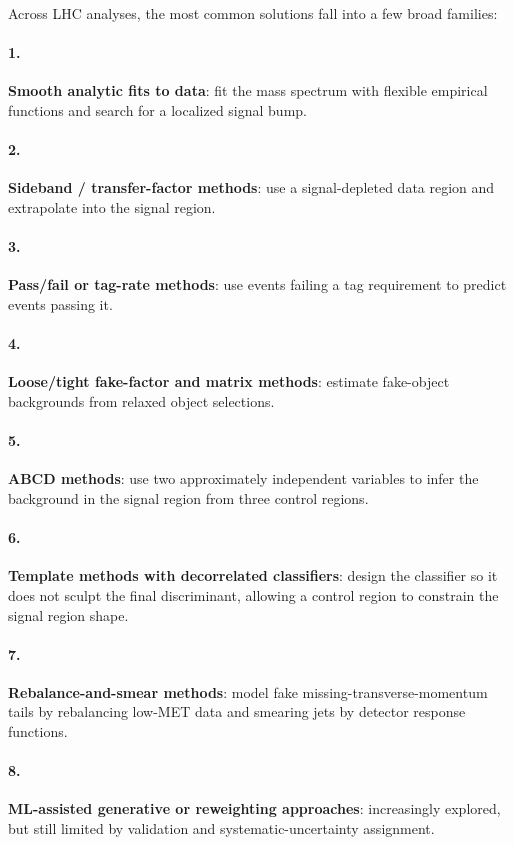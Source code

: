 \documentclass[11pt]{article}
\begin{document}
Across LHC analyses, the most common solutions fall into a few broad families:

\paragraph{1.} \textbf{Smooth analytic fits to data}: fit the mass spectrum with flexible empirical functions and search for a localized signal bump.
\paragraph{2.} \textbf{Sideband / transfer-factor methods}: use a signal-depleted data region and extrapolate into the signal region.
\paragraph{3.} \textbf{Pass/fail or tag-rate methods}: use events failing a tag requirement to predict events passing it.
\paragraph{4.} \textbf{Loose/tight fake-factor and matrix methods}: estimate fake-object backgrounds from relaxed object selections.
\paragraph{5.} \textbf{ABCD methods}: use two approximately independent variables to infer the background in the signal region from three control regions.
\paragraph{6.} \textbf{Template methods with decorrelated classifiers}: design the classifier so it does not sculpt the final discriminant, allowing a control region to constrain the signal region shape.
\paragraph{7.} \textbf{Rebalance-and-smear methods}: model fake missing-transverse-momentum tails by rebalancing low-MET data and smearing jets by detector response functions.
\paragraph{8.} \textbf{ML-assisted generative or reweighting approaches}: increasingly explored, but still limited by validation and systematic-uncertainty assignment.
\end{document}
